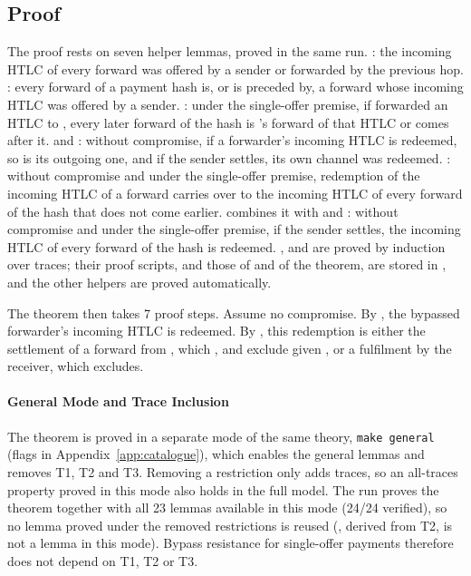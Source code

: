 \subsection{Proof}\label{sec:bypass-proof}

The proof rests on seven helper lemmas, proved in the same run.
: the incoming HTLC of every forward was offered by a sender or forwarded
by the previous hop. : every forward of a payment hash is, or is preceded by, a
forward whose incoming HTLC was offered by a sender. : under the
single-offer premise, if  forwarded an HTLC to , every later forward of the
hash is 's forward of that HTLC or comes after it.  and
: without compromise, if a forwarder's incoming HTLC is redeemed,
so is its outgoing one, and if the sender settles, its own channel was redeemed.
: without compromise and under the single-offer premise, redemption of
the incoming HTLC of a forward carries over to the incoming HTLC of every forward of the hash
that does not come earlier.  combines it with
 and : without compromise and under the
single-offer premise, if the sender settles, the incoming HTLC of every forward of the hash is
redeemed. ,  and  are proved by
induction over traces; their proof scripts, and those of  and
of the theorem, are stored in , and the other helpers are proved
automatically.

The theorem then takes 7 proof steps. Assume no compromise. By
, the bypassed forwarder's incoming HTLC  is
redeemed. By , this redemption is either the settlement of a forward from
, which ,  and
 exclude given , or a
fulfilment by the receiver, which  excludes.

\paragraph{General Mode and Trace Inclusion}
The theorem is proved in a separate mode of the same theory, \texttt{make general} (flags in
Appendix~\ref{app:catalogue}), which enables the general lemmas and removes T1, T2 and T3. Removing a restriction only adds
traces, so an all-traces property proved in this mode also holds in the full model. The run
proves the theorem together with all 23 \code{[reuse]} lemmas available in this mode (24/24
verified), so no lemma proved under the removed restrictions is reused (,
derived from T2, is not a \code{[reuse]} lemma in this mode). Bypass resistance for
single-offer payments therefore does not depend on T1, T2 or T3.

